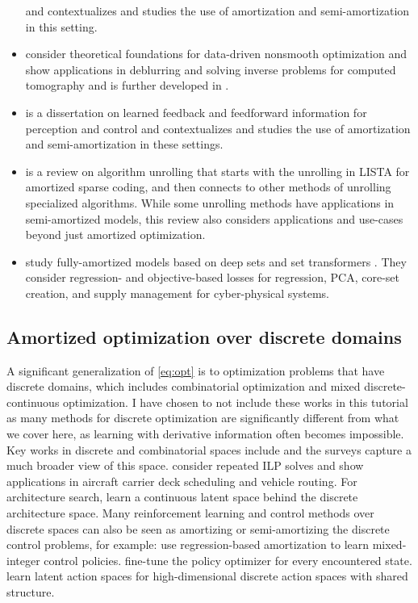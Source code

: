 \documentclass[twoside,11pt]{article}
\begin{document}
\begin{itemize}
  and contextualizes and studies the use of amortization and
  semi-amortization in this setting.
\item \citet{banert2020data} consider theoretical foundations
  for data-driven nonsmooth optimization and show applications
  in deblurring and solving inverse problems for
  computed tomography and is further developed in
  \citet{banert2021accelerated}.
\item \citet{marino2021learned} is a dissertation on learned
  feedback and feedforward information for perception and control
  and contextualizes and studies the use of amortization and
  semi-amortization in these settings.
\item \citet{monga2021algorithm} is a review on
  algorithm unrolling that starts with the unrolling
  in LISTA \citep{gregor2010learning} for amortized
  sparse coding, and then connects to other methods
  of unrolling specialized algorithms.
  While some unrolling methods have applications in
  semi-amortized models, this review also considers
  applications and use-cases beyond just
  amortized optimization.
\item \citet{liu2022teaching} study fully-amortized
  models based on deep sets \citep{zaheer2017deep}
  and set transformers \citep{lee2019set}.
  They consider regression- and objective-based losses
  for regression, PCA, core-set creation, and
  supply management for cyber-physical systems.
\end{itemize}

\subsection{Amortized optimization over discrete domains}
A significant generalization of \cref{eq:opt} is to optimization
problems that have discrete domains,
which includes combinatorial optimization
and mixed discrete-continuous optimization.
I have chosen to not include these works in this tutorial
as many methods for discrete optimization are significantly
different from what we cover here, as learning with
derivative information often becomes impossible.
Key works in discrete and combinatorial spaces include
\citet{khalil2016learning,dai2017learning,jeong2019learning,bertsimas2019online,shao2021learning,bertsimas2021voice,cappart2021combinatorial}
and the surveys
\citep{lodi2017learning,bengio2021machine,kotary2021end}
capture a much broader view of this space.
\citet{banerjee2015efficiently} consider repeated ILP solves
and show applications in aircraft carrier deck scheduling and vehicle routing.
For architecture search, \citet{luo2018neural} learn a continuous
latent space behind the discrete architecture space.
Many reinforcement learning and control methods over discrete
spaces can also be seen as amortizing or semi-amortizing the
discrete control problems, for example:
\citet{cauligi2020learning,cauligi2021coco} use regression-based
amortization to learn mixed-integer control policies.
\citet{fickinger2021scalable} fine-tune the policy
optimizer for every encountered state.
\citet{tennenholtz2019natural,chandak2019learning,van2020q}
learn latent action spaces for high-dimensional
discrete action spaces with shared structure.
\end{document}
